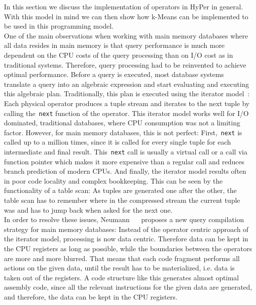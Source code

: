 In this section we discuss the implementation of operators in HyPer in general. With this model in mind we can then show how k-Means can be implemented to be used in this programming model. 
\\
One of the main observations when working with main memory databases where all data resides in main memory is that query performance is much more dependent on the CPU costs of the query processing than on I/O cost as in traditional systems. Therefore, query processing had to be reinvented to achieve optimal performance.
Before a query is executed, most database systems translate a query into an algebraic expression and start evaluating and executing this algebraic plan. Traditionally, this plan is executed using the iterator model~\parencite{iterator}: Each physical operator produces a tuple stream and iterates to the next tuple by calling the~\texttt{next} function of the operator. This iterator model works well for I/O dominated, traditional databases, where CPU consumption was not a limiting factor. However, for main memory databases, this is not perfect: First,~\texttt{next} is called up to a million times, since it is called for every single tuple for each intermediate and final result. This~\texttt{next} call is usually a virtual call or a call via function pointer which makes it more expensive than a regular call and reduces branch prediction of modern CPUs. And finally, the iterator model results often in poor code locality and complex bookkeeping. This can be seen by the functionality of a table scan: As tuples are generated one after the other, the table scan has to remember where in the compressed stream the current tuple was and has to jump back when asked for the next one. 
\\
In order to resolve these issues, Neumann~\parencite{neumann} ~\parencite{neumann+leis} proposes a new query compilation strategy for main memory databases: Instead of the operator centric approach of the iterator model, processing is now data centric. Therefore data can be kept in the CPU registers as long as possible, while the boundaries between the operators are more and more blurred. That means that each code fragment performs all actions on the given data, until the result has to be materialized, i.e. data is taken out of the registers. A code structure like this generates almost optimal assembly code, since all the relevant instructions for the given data are generated, and therefore, the data can be kept in the CPU registers.
\\
